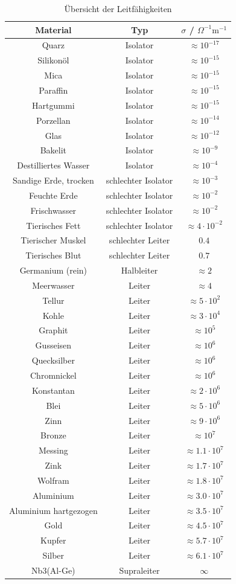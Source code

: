 \begin{table}[H]
\centering
\begin{tabular}{ccc}\hline
\textbf{Material}&\textbf{Typ}&\textbf{$\sigma$ / $\Omega^{-1}\text{m}^{-1}$}\\\hline
Quarz &Isolator&$\approx 10^{-17}$\\
Silikonöl&Isolator&$\approx 10^{-15}$\\
Mica&Isolator&$\approx 10^{-15}$\\
Paraffin&Isolator&$\approx 10^{-15}$\\
Hartgummi &Isolator&$\approx 10^{-15}$\\
Porzellan&Isolator&$\approx 10^{-14}$\\
Glas&Isolator&$\approx 10^{-12}$\\
Bakelit&Isolator&$\approx 10^{-9}$\\
Destilliertes Wasser&Isolator&$\approx 10^{-4}$\\
Sandige Erde, trocken &schlechter Isolator&$\approx 10^{-3}$\\
Feuchte Erde &schlechter Isolator&$\approx 10^{-2}$\\
Frischwasser &schlechter Isolator&$\approx 10^{-2}$\\
Tierisches Fett&schlechter Isolator&$\approx 4\cdot 10^{-2}$\\
Tierischer Muskel &schlechter Leiter&$0.4$\\
Tierisches Blut &schlechter Leiter&$0.7$\\
Germanium (rein)&Halbleiter&$\approx 2$\\
Meerwasser &Leiter&$\approx 4$\\
Tellur&Leiter&$\approx 5\cdot 10^{2}$\\
Kohle &Leiter&$\approx 3\cdot 10^{4}$\\
Graphit &Leiter&$\approx 10^{5}$\\
Gusseisen &Leiter&$\approx 10^{6}$\\
Quecksilber &Leiter&$\approx 10^{6}$\\
Chromnickel&Leiter&$\approx 10^{6}$\\
Konstantan &Leiter&$\approx 2\cdot 10^{6}$\\
Blei&Leiter&$\approx 5\cdot 10^{6}$\\
Zinn &Leiter&$\approx 9\cdot 10^{6}$\\
Bronze &Leiter&$\approx 10^{7}$\\
Messing &Leiter&$\approx 1.1\cdot 10^{7}$\\
Zink &Leiter&$\approx 1.7\cdot 10^{7}$\\
Wolfram&Leiter&$\approx 1.8\cdot 10^{7}$\\
Aluminium &Leiter&$\approx 3.0\cdot 10^{7}$\\
Aluminium hartgezogen &Leiter&$\approx 3.5\cdot 10^{7}$\\
Gold&Leiter&$\approx 4.5\cdot 10^{7}$\\
Kupfer &Leiter&$\approx 5.7\cdot 10^{7}$\\
Silber&Leiter&$\approx 6.1\cdot 10^{7}$\\
Nb3(Al-Ge)&Supraleiter&$\infty$\\\hline
\end{tabular}
\caption{Übersicht der Leitfähigkeiten}
\end{table}
